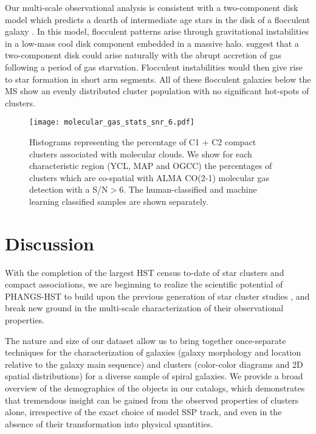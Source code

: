 \documentclass[]{aastex631}
\begin{document}
Our multi-scale observational analysis is consistent with a two-component disk model which predicts a dearth of intermediate age stars in the disk of a flocculent galaxy \citep{ET93,SM22}.  In this model, flocculent patterns arise through gravitational instabilities in a low-mass cool disk component embedded in a massive halo. \citet{SM22} suggest that a two-component disk could arise naturally with the abrupt accretion of gas following a period of gas starvation. Flocculent instabilities would then give rise to star formation in short arm segments. 
All of these flocculent galaxies below the MS show an evenly distributed cluster population with no significant hot-spots of clusters. 

%
\begin{figure} 
\texttt{[image: molecular\_gas\_stats\_snr\_6.pdf]}
\caption{Histograms representing the percentage of C1 + C2 compact clusters associated with molecular clouds. We show for each characteristic region (YCL, MAP and OGCC) the percentages of clusters which are co-spatial with ALMA CO(2-1) molecular gas detection with a S/N$>6$. The human-classified and machine learning classified samples are shown separately.}
 \label{fig:dist_gmc}
\end{figure}
%
\section{Discussion}\label{sect:discussion}

With the completion of the largest HST census to-date of star clusters and compact associations, we are beginning to realize the scientific potential of PHANGS-HST to build upon the previous generation of star cluster studies \citep[e.g.,][and references therein]{portegies_zwart_young_2010, renaud_star_2018, krumholz_star_2019, adamo20}, and break new ground in the multi-scale characterization of their observational properties.  

The nature and size of our dataset allow us to bring together once-separate techniques for the characterization of galaxies (galaxy morphology and location relative to the galaxy main sequence) and clusters (color-color diagrams and 2D spatial distributions) for a diverse sample of spiral galaxies.  We provide a broad overview of the demographics of the objects in our catalogs, which demonstrates that tremendous insight can be gained from the observed properties of clusters alone, irrespective of the exact choice of model SSP track, and even in the absence of their transformation into physical quantities.  
\end{document}
